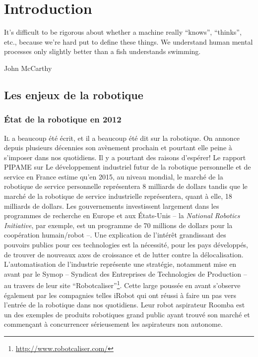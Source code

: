\chapter{Introduction}\label{chap:chap0}

\epigraph{It's difficult to be rigorous about whether a machine really
  ``knows'', ``thinks'', etc., because we're hard put to define these
  things. We understand human mental processes only slightly better
  than a fish understands swimming.}{John McCarthy}
\clearpage

\section{Les enjeux de la robotique}

\subsection{État de la robotique en 2012}

\lettrine[lines=2, lraise=0.1, nindent=0em, slope=-.5em]%
{I}{l} a beaucoup été écrit, et il a beaucoup été dit sur la
robotique. On annonce depuis plusieurs décennies son avènement
prochain et pourtant elle peine à s'imposer dans nos quotidiens. Il y
a pourtant des raisons d'espérer! Le rapport PIPAME sur Le
développement industriel futur de la robotique personnelle et de
service en France \citep{12erdyn} estime qu'en 2015, au niveau mondial,
le marché de la robotique de service personnelle représentera 8
milliards de dollars tandis que le marché de la robotique de service
industrielle représentera, quant à elle, 18 milliards de dollars. Les
gouvernements investissent largement dans les programmes de recherche
en Europe et aux États-Unis -- la \emph{National Robotics Initiative},
par exemple, est un programme de 70 millions de dollars pour la
coopération humain/robot --. Une explication de l'intérêt grandissant
des pouvoirs publics pour ces technologies est la nécessité, pour les
pays développés, de trouver de nouveaux axes de croissance et de
lutter contre la délocalisation. L'automatisation de l'industrie
représente une stratégie, notamment mise en avant par le Symop --
Syndicat des Entreprises de Technologies de Production -- au travers
de leur site
``Robotcaliser''\footnote{\url{http://www.robotcaliser.com/}}. Cette
large poussée en avant s'observe également par les compagnies telles
iRobot qui ont réussi à faire un pas vers l'entrée de la robotique
dans nos quotidiens. Leur robot aspirateur Roomba est un des exemples
de produits robotiques grand public ayant trouvé son marché et
commençant à concurrencer sérieusement les aspirateurs non autonome.



